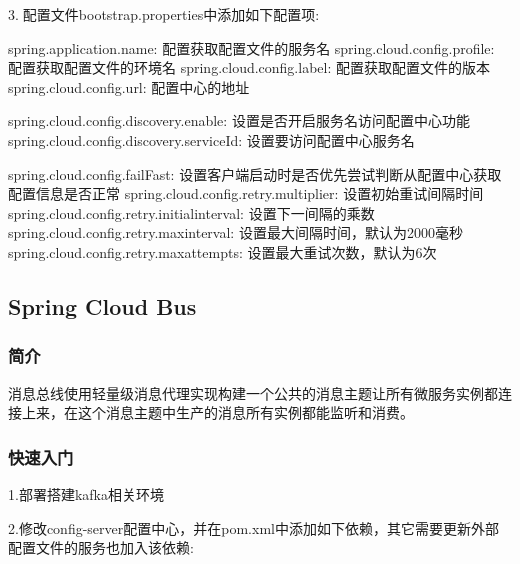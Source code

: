 \documentclass[letterpaper,10pt,english]{sphinxmanual}
\begin{document}
3.配置文件bootstrap.properties中添加如下配置项:

\begin{sphinxVerbatim}[commandchars=\\\{\}]
spring.application.name: 配置获取配置文件的服务名
spring.cloud.config.profile: 配置获取配置文件的环境名
spring.cloud.config.label: 配置获取配置文件的版本
spring.cloud.config.url: 配置中心的地址

spring.cloud.config.discovery.enable: 设置是否开启服务名访问配置中心功能
spring.cloud.config.discovery.serviceId: 设置要访问配置中心服务名

spring.cloud.config.failFast: 设置客户端启动时是否优先尝试判断从配置中心获取配置信息是否正常
spring.cloud.config.retry.multiplier: 设置初始重试间隔时间
spring.cloud.config.retry.initial\PYGZhy{}interval: 设置下一间隔的乘数
spring.cloud.config.retry.max\PYGZhy{}interval: 设置最大间隔时间，默认为2000毫秒
spring.cloud.config.retry.max\PYGZhy{}attempts: 设置最大重试次数，默认为6次
\end{sphinxVerbatim}


\subsection{Spring Cloud Bus}
\label{\detokenize{01.spring-cloud/06.bus/bus:spring-cloud-bus}}\label{\detokenize{01.spring-cloud/06.bus/bus::doc}}

\subsubsection{简介}
\label{\detokenize{01.spring-cloud/06.bus/bus_01:id1}}\label{\detokenize{01.spring-cloud/06.bus/bus_01::doc}}
消息总线使用轻量级消息代理实现构建一个公共的消息主题让所有微服务实例都连接上来，在这个消息主题中生产的消息所有实例都能监听和消费。


\subsubsection{快速入门}
\label{\detokenize{01.spring-cloud/06.bus/bus_01:id2}}
1.部署搭建kafka相关环境

2.修改config-server配置中心，并在pom.xml中添加如下依赖，其它需要更新外部配置文件的服务也加入该依赖:

\begin{sphinxVerbatim}[commandchars=\\\{\}]
\end{sphinxVerbatim}
\end{document}
